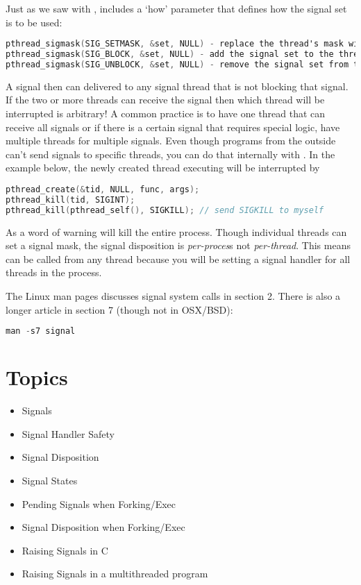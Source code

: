 Just as we saw with ,  includes a `how' parameter that defines how the signal set is to be used:

\begin{lstlisting}[language=C]
pthread_sigmask(SIG_SETMASK, &set, NULL) - replace the thread's mask with given signal set
pthread_sigmask(SIG_BLOCK, &set, NULL) - add the signal set to the thread's mask
pthread_sigmask(SIG_UNBLOCK, &set, NULL) - remove the signal set from the thread's mask
\end{lstlisting}

A signal then can delivered to any signal thread that is not blocking that signal.
If the two or more threads can receive the signal then which thread will be interrupted is arbitrary!
A common practice is to have one thread that can receive all signals or if there is a certain signal that requires special logic, have multiple threads for multiple signals.
Even though programs from the outside can't send signals to specific threads, you can do that internally with .
In the example below, the newly created thread executing  will be interrupted by 

\begin{lstlisting}[language=C]
pthread_create(&tid, NULL, func, args);
pthread_kill(tid, SIGINT);
pthread_kill(pthread_self(), SIGKILL); // send SIGKILL to myself
\end{lstlisting}

As a word of warning  will kill the entire process.
Though individual threads can set a signal mask, the signal disposition is \emph{per-proces}s not \emph{per-thread}.
This means  can be called from any thread because you will be setting a signal handler for all threads in the process.

The Linux man pages discusses signal system calls in section 2. There is also a longer article in section 7 (though not in OSX/BSD):

\begin{lstlisting}[language=C]
man -s7 signal
\end{lstlisting}

\section{Topics}

\begin{itemize}
\tightlist
\item
  Signals
\item
  Signal Handler Safety
\item
  Signal Disposition
\item
  Signal States
\item
  Pending Signals when Forking/Exec
\item
  Signal Disposition when Forking/Exec
\item
  Raising Signals in C
\item
  Raising Signals in a multithreaded program
\end{itemize}

